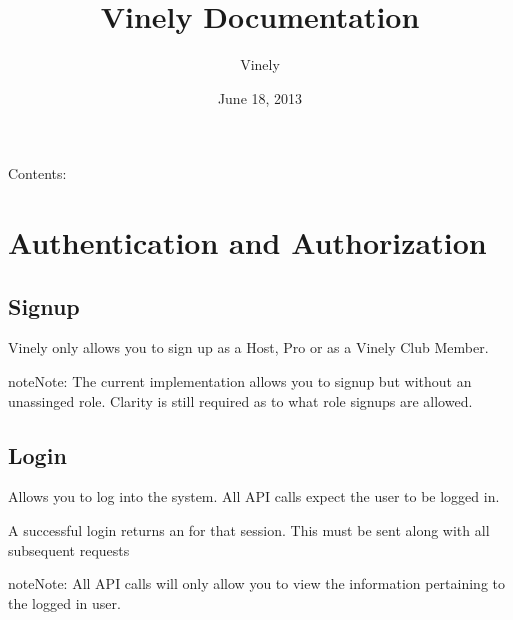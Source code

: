 \documentclass[letterpaper,10pt,english]{sphinxmanual}
\title{Vinely Documentation}
\date{June 18, 2013}
\author{Vinely}
\begin{document}
\maketitle
\tableofcontents
{}\label{index::doc}


Contents:


\chapter{Authentication and Authorization}
\label{auth:authentication-and-authorization}\label{auth:welcome-to-vinely-s-documentation}\label{auth::doc}\label{auth:ref-auth}

\section{Signup}
\label{auth:signup}
Vinely only allows you to sign up as a Host, Pro or as a Vinely Club Member.


\begin{fulllineitems}
\label{auth:post--api-v1-auth-signup-}
\end{fulllineitems}


\begin{notice}{note}{Note:}
The current implementation allows you to signup but without an unassinged role.
Clarity is still required as to what role signups are allowed.
\end{notice}


\section{Login}
\label{auth:login}
Allows you to log into the system. All API calls expect the user to be logged in.


\begin{fulllineitems}
\label{auth:post--api-v1-auth-login-}
\end{fulllineitems}


A successful login returns an  for that session. This  must be sent along with
all subsequent requests

\begin{notice}{note}{Note:}
All API calls will only allow you to view the information pertaining to the logged in user.
\end{notice}
\end{document}
